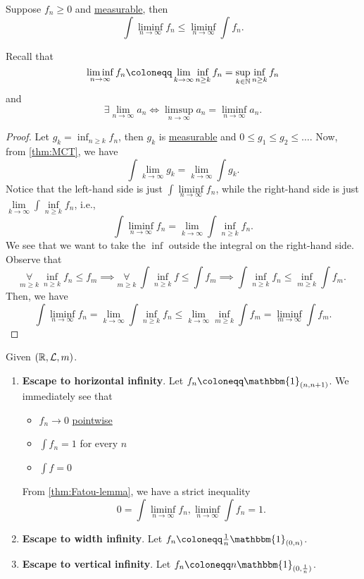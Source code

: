 \begin{theorem}\label{thm:Fatou-lemma}
	Suppose \(f_{n}\geq 0\) and \hyperref[def:measurable-function]{measurable}, then
	\[
		\int \liminf_{n \to \infty} f_{n}\leq \liminf_{n \to \infty} \int f_{n}.
	\]
\end{theorem}
\begin{remark}
	Recall that
	\[
		\liminf_{n \to \infty} f_{n} \coloneqq \lim\limits_{k \to \infty} \inf_{n\geq k}f_{n} = \sup _{k\in\mathbb{\MakeUppercase{n}} }\inf _{n\geq k}f_{n}
	\]
	and
	\[
		\exists\lim\limits_{n \to \infty} a_{n}\iff \limsup_{n \to \infty} a_{n} = \liminf_{n \to \infty} a_{n}.
	\]
\end{remark}
\begin{proof}
	Let \(g_{k} = \inf _{n\geq k}f_{n}\), then \(g_{k}\) is \hyperref[def:measurable-function]{measurable} and \(0\leq g_1 \leq g_2 \leq \ldots  \). Now, from \autoref{thm:MCT}, we have
	\[
		\int \lim\limits_{k \to \infty}  g_{k} = \lim\limits_{k \to \infty} \int g_{k}.
	\]
	Notice that the left-hand side is just \(\int \liminf\limits_{n \to \infty} f_{n}\), while the right-hand side is just \(\lim\limits_{k \to \infty} \int \inf\limits _{n\geq k}f_{n}\),
	i.e.,
	\[
		\int \liminf_{n \to \infty} f_{n} = \lim\limits_{k \to \infty} \int \inf _{n\geq k}f_{n}.
	\]
	We see that we want to take the \(\inf\) outside the integral on the right-hand side. Observe that
	\[
		\underset{m\geq k}{\forall }\ \inf _{n\geq k}f_{n}\leq f _{m} \implies \underset{m\geq k}{\forall }\ \int \inf _{n\geq k}f\leq \int f _{m}\implies \int \inf _{n\geq k}f_{n}\leq \inf_{m\geq k}\int f _{m}.
	\]
	Then, we have
	\[
		\int \liminf_{n \to \infty} f_{n} = \lim\limits_{k \to \infty} \int \inf _{n\geq k}f_{n}\leq \lim\limits_{k \to \infty} \inf _{m\geq k}\int f _{m} = \liminf_{m \to \infty} \int f _{m}.
	\]
\end{proof}

\begin{eg}
	Given \((\mathbb{\MakeUppercase{r}} , \mathcal{\MakeUppercase{l}} , m)\).
	\begin{enumerate}
		\item \textbf{Escape to horizontal infinity}. Let \(f_{n}\coloneqq \mathbbm{1}_{(n, n+1)} \). We immediately see that
		      \begin{itemize}
			      \item \(f_{n}\to 0\) \hyperref[def:pointwise-convergence]{pointwise}
			      \item \(\int f_{n} = 1\) for every \(n\)
			      \item \(\int f = 0\)
		      \end{itemize}
		      From \autoref{thm:Fatou-lemma}, we have a strict inequality
		      \[
			      0 = \int \liminf_{n \to \infty} f_{n} , \liminf_{n \to \infty} \int f_{n} = 1.
		      \]
		\item \textbf{Escape to width infinity}. Let \(f_{n}\coloneqq \frac{1}{n}\mathbbm{1}_{(0, n)} \).
		\item \textbf{Escape to vertical infinity}. Let \(f_{n}\coloneqq n \mathbbm{1}_{(0, \frac{1}{n})} \).
	\end{enumerate}
\end{eg}

